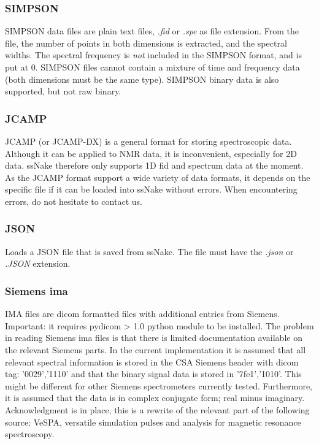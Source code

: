 \documentclass[11pt,a4paper]{article}
\begin{document}
\subsubsection*{SIMPSON}
SIMPSON data files are plain text files, \textit{.fid} or \textit{.spe} as file extension. From the file, the number of points in both dimensions is extracted, and the spectral widths. The spectral frequency is \textit{not} included in the SIMPSON format, and is put at 0. SIMPSON files cannot contain a mixture of time and frequency data (both dimensions must be the same type). SIMPSON binary data is also supported, but not raw binary.

\subsubsection*{JCAMP}
JCAMP (or JCAMP-DX) is a general format for storing spectroscopic data. Although it can be applied to NMR data, it is inconvenient, especially for 2D data. ssNake therefore only supports 1D fid and spectrum data at the moment. As the JCAMP format support a wide variety of data formats, it depends on the specific file if it can be loaded into ssNake without errors. When encountering errors, do not hesitate to contact us.

\subsubsection*{JSON}
Loads a JSON file that is saved from ssNake. The file must have the \textit{.json} or \textit{.JSON} extension.

\subsubsection*{Siemens ima}
IMA files are dicom formatted files with additional entries from Siemens. Important: it requires pydicom > 1.0 python module to be installed. The problem in reading Siemens ima files is that there is limited documentation available on the relevant Siemens parts. In the current implementation it is assumed that all relevant spectral information is stored in the CSA Siemens header with dicom tag: '0029','1110' and that the binary signal data is stored in '7fe1','1010'. This might be different for other Siemens spectrometers currently tested. Furthermore, it is assumed that the data is in complex conjugate form; real minus imaginary. Acknowledgment is in place, this is a rewrite of the relevant part of the following source: VeSPA, versatile simulation pulses and analysis for magnetic resonance spectroscopy.
\end{document}
